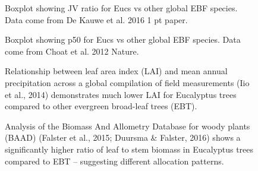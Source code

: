 \documentclass[12pt,a4paper,oneside]{article}
\begin{document}
\FloatBarrier

\begin{figure}[!hbtp]
\centering
{}
\caption{\small{Boxplot showing JV ratio for Eucs vs other global EBF species. Data come from De Kauwe et al. 2016 1 pt paper.}}
\label{}
\end{figure}


\FloatBarrier

\begin{figure}[!hbtp]
\centering
{}
\caption{\small{Boxplot showing p50 for Eucs vs other global EBF species. Data come from Choat et al. 2012 Nature.}}
\label{}
\end{figure}

\FloatBarrier

\begin{figure}[!hbtp]
\centering
{}
\caption{\small{Relationship between leaf area index (LAI) and mean annual precipitation across a global compilation of field measurements (Iio et al., 2014) demonstrates much lower LAI for Eucalyptus trees compared to other evergreen broad-leaf trees (EBT).}}
\label{}
\end{figure}

\FloatBarrier

\begin{figure}[!hbtp]
\centering
{}
\caption{\small{Analysis of the Biomass And Allometry Database for woody plants (BAAD) (Falster et al., 2015; Duursma \& Falster, 2016) shows a significantly higher ratio of leaf to stem biomass in Eucalyptus trees compared to EBT -- suggesting different allocation patterns.}}
\label{}
\end{figure}
\end{document}
